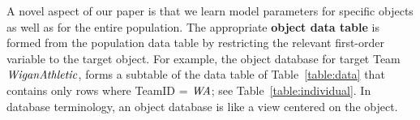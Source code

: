 {{\begin{table}[htbp]
				\caption{Sample Object Data Table, for team $\team = \it{WA}$; all rows have WA in the $T$ column. \label{table:individual}}
		\end{table}
		
		
		
		
		A novel aspect of our paper is that we learn model parameters for specific objects as well as for the entire population. 
		The appropriate \textbf{object data table} is formed from the population data table by restricting the relevant first-order variable to the target object. 
		For example, the object database for target Team $\it{Wigan Athletic}$, 
		forms a subtable of the data table of Table~\ref{table:data} that contains only rows where 
		TeamID = $\it{WA}$; see Table~\ref{table:individual}. In database terminology, an object database is like a view centered on the object.
		
		\begin{table} 


\end{table}}}

